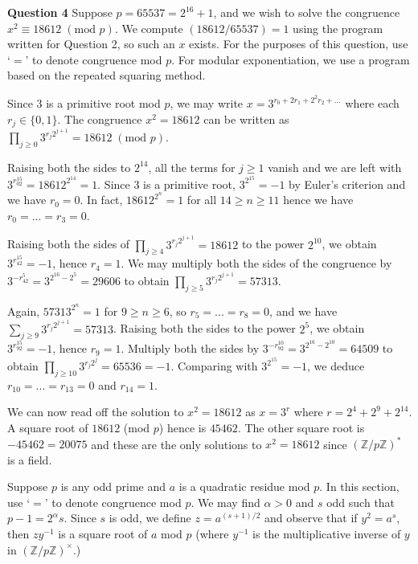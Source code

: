 \documentclass[12pt]{article}
\newcommand{\textmod}[1]{\;(\text{mod }#1)}
\begin{document}
\textbf{Question 4}\quad
Suppose \(p=65537=2^{16}+1\), and we wish to solve the congruence \(x^2\equiv
18612 \textmod{p}\). We compute \((18612/65537)=1\) using the program written
for Question 2, so such an \(x\) exists. For the purposes of this question, use
`\(=\)' to denote congruence mod \(p\). For modular exponentiation, we use a
program based on the repeated squaring method.

Since \(3\) is a primitive root mod \(p\), we may write \(x =
3^{r_0+2r_1+2^2r_2+...}\) where each \(r_j\in \{0,1\}\). The congruence
\(x^2=18612\) can be written as \(\prod_{j\geq 0} 3^{r_j2^{j+1}} = 18612
\textmod{p}\). 

Raising both the sides to \(2^{14}\), all the terms for \(j\geq 1\) vanish and
we are left with \(3^{r_02^{15}}= 18612^{2^{14}} = 1\). Since \(3\) is a
primitive root, \(3^{2^{15}} = -1\) by Euler's criterion and we have \(r_0=0\).
In fact, \(18612^{2^n}=1\) for all \(14\geq n\geq 11\) hence we have \(r_0=...=r_3 =
0\). 

Raising both the sides of \(\prod_{j\geq 4}3^{r_j2^{j+1}}=18612\) to the power
\(2^{10}\), we obtain \(3^{r_42^{15}}=-1\), hence \(r_4 = 1\). We may multiply
both the sides of the congruence by \(3^{-r_42^5} = 3^{2^{16}-2^5} = 29606\) to
obtain \(\prod_{j\geq 5}3^{r_j2^{j+1}}=57313.\) 

Again, \(57313^{2^n}=1\) for \(9\geq n \geq 6\), so \(r_5=...=r_8=0\), and we
have \(\sum_{j\geq 9}3^{r_j2^{j+1}} = 57313\). Raising both the sides to the
power \(2^5\), we obtain \(3^{r_92^{15}}=-1\), hence \(r_9 = 1\). Multiply both
the sides by \(3^{-r_92^{10}} = 3^{2^{16}-2^{10}} = 64509\) to obtain
\(\prod_{j\geq 10}3^{r_j2^j} = 65536 = -1\). Comparing with \(3^{2^{15}} = -1\),
we deduce \(r_{10} = ... = r_{13}=0\) and \(r_{14}=1\).

We can now read off the solution to \(x^2 = 18612\) as \(x= 3^r\) where
\(r=2^4+2^9+2^{14}\). A square root of \(18612\) (mod \(p\)) hence is
\(45462\). The other square root is \(-45462= 20075\) and these are the only
solutions to \(x^2 =18612\) since \((\mathbb{Z}/p\mathbb{Z})^\ast\) is a field.

\hfill 

Suppose \(p\) is any odd prime and \(a\) is a quadratic residue mod \(p\). In
this section, use `\(=\)' to denote congruence mod \(p\). We may find \(\alpha >
0\) and \(s\) odd such that \(p-1 = 2^\alpha s\). Since \(s\) is odd, we
define \(z = a^{(s+1)/2}\) and observe that if \(y^2 = a^s\), then \(zy^{-1}\)
is a square root of \(a\) mod \(p\) (where \(y^{-1}\) is the multiplicative inverse of
\(y\) in \((\mathbb{Z}/p\mathbb{Z})^\times\).)
\end{document}
